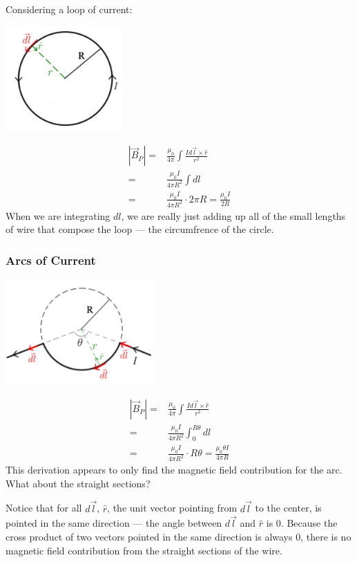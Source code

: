 \documentclass[12pt, titlepage]{article}
\begin{document}
Considering a loop of current: 
\begin{center}
    \includegraphics*[height=4cm]{media/loop.png}
\end{center}
\begin{align*}
    |\vec{B}_P| =& \frac{\mu_0}{4\pi} \int \frac{Id\vec{l}\times\hat{r}}{r^2} \\
    =& \frac{\mu_0I}{4 \pi R^2} \int dl \\
    =& \frac{\mu_0I}{4 \pi R^2} \cdot 2\pi R = \boxed{\frac{\mu_0I}{2R}}
\end{align*}
When we are integrating $dl$, we are really just adding up all of the small lengths of wire that compose the loop --- the circumfrence of the circle.

\subsubsection*{Arcs of Current}
\begin{center}
    \includegraphics*[height=4cm]{media/bentloop.png}
\end{center}
\begin{align*}
    |\vec{B}_P| =& \frac{\mu_0}{4\pi} \int \frac{Id\vec{l}\times\hat{r}}{r^2} \\
    =& \frac{\mu_0I}{4 \pi R^2} \int_{0}^{R \theta} dl \\
    =& \frac{\mu_0I}{4 \pi R^2} \cdot R\theta = \boxed{\frac{\mu_0 \theta I}{4 \pi R}}
\end{align*}
This derivation appears to only find the magnetic field contribution for the arc. What about the straight sections?

Notice that for all $d\vec{l}$, $\hat{r}$, the unit vector pointing from $d\vec{l}$ to the center, is pointed in the same direction --- the angle between $d\vec{l}$ and $\hat{r}$ is 0. Because the cross product of two vectors pointed in the same direction is always 0, there is no magnetic field contribution from the straight sections of the wire.
\end{document}
